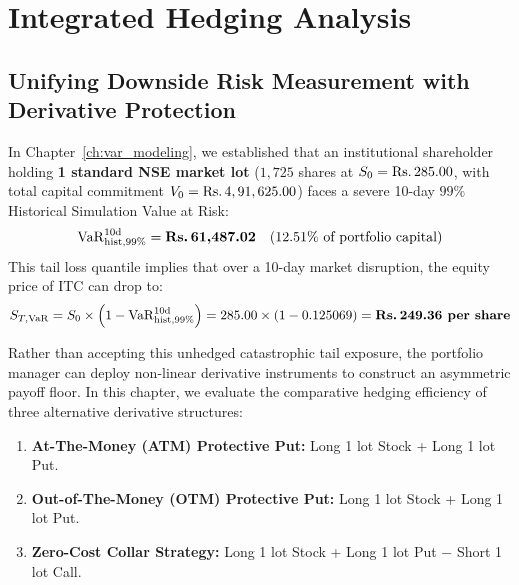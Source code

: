 
\chapter{Integrated Hedging Analysis}
\label{ch:hedging}

\section{Unifying Downside Risk Measurement with Derivative Protection}
\label{sec:unifying_risk_hedging}

In Chapter~\ref{ch:var_modeling}, we established that an institutional shareholder holding \textbf{1 standard NSE market lot} ($1,725$ shares at $S_0 = \text{\text{Rs.}\,}285.00$, with total capital commitment $V_0 = \text{\text{Rs.}\,}4,91,625.00$) faces a severe 10-day $99\%$ Historical Simulation Value at Risk:
\begin{equation}
\operatorname{VaR}_{\text{hist}, 99\%}^{10\text{d}} = \text{\textbf{\text{Rs.}\,61,487.02}} \quad (12.51\% \text{ of portfolio capital})
\end{equation}
This tail loss quantile implies that over a 10-day market disruption, the equity price of ITC can drop to:
\begin{equation}
S_{T, \operatorname{VaR}} = S_0 \times \left(1 - \operatorname{VaR}_{\text{hist}, 99\%}^{10\text{d}}\right) = 285.00 \times (1 - 0.125069) = \text{\textbf{\text{Rs.}\,249.36 per share}}
\end{equation}

Rather than accepting this unhedged catastrophic tail exposure, the portfolio manager can deploy non-linear derivative instruments to construct an asymmetric payoff floor. In this chapter, we evaluate the comparative hedging efficiency of three alternative derivative structures:
\begin{enumerate}
    \item \textbf{At-The-Money (ATM) Protective Put:} Long 1 lot Stock + Long 1 lot  Put.
    \item \textbf{Out-of-The-Money (OTM) Protective Put:} Long 1 lot Stock + Long 1 lot  Put.
    \item \textbf{Zero-Cost Collar Strategy:} Long 1 lot Stock + Long 1 lot  Put $-$ Short 1 lot  Call.
\end{enumerate}

